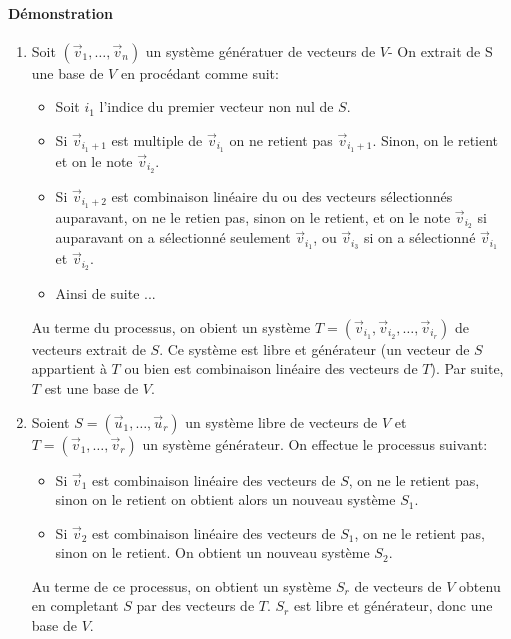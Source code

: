 \paragraph{Démonstration}
\begin{enumerate}
  \item Soit $(\vec{v}_1, \ldots, \vec{v}_n)$ un système génératuer de vecteurs de $V$- On extrait de S une base de $V$ en procédant comme suit:
    \begin{itemize}
      \item Soit $i_1$ l'indice du premier vecteur non nul de $S$.
      \item Si $\vec{v}_{i_1 + 1}$ est multiple de $\vec{v}_{i_1}$ on ne retient pas $\vec{v}_{i_1 + 1}$. Sinon, on le retient et on le note $\vec{v}_{i_2}$.
      \item Si $\vec{v}_{i_1 + 2}$ est combinaison linéaire du ou des vecteurs sélectionnés auparavant, on ne le retien pas, sinon on le retient, et on le note $\vec{v}_{i_2}$ si auparavant on a sélectionné seulement $\vec{v}_{i_1}$, ou $\vec{v}_{i_3}$ si on a sélectionné $\vec{v}_{i_1}$ et $\vec{v}_{i_2}$.
      \item Ainsi de suite ...
    \end{itemize}
    Au terme du processus, on obient un système $T = (\vec{v}_{i_1}, \vec{v}_{i_2}, \ldots, \vec{v}_{i_r})$ de vecteurs extrait de $S$. Ce système est libre et générateur (un vecteur de $S$ appartient à $T$ ou bien est combinaison linéaire des vecteurs de $T$). Par suite, $T$ est une base de $V$.
  
  \item Soient $S=(\vec{u}_1, \ldots, \vec{u}_r)$ un système libre de vecteurs de $V$ et $T=(\vec{v}_1, \ldots, \vec{v}_r)$ un système générateur. On effectue le processus suivant:
    \begin{itemize}
      \item Si $\vec{v}_1$ est combinaison linéaire des  vecteurs de $S$, on ne le retient pas, sinon on le retient on obtient alors un nouveau système $S_1$.
      \item Si $\vec{v}_2$ est combinaison linéaire des vecteurs de $S_1$, on ne le retient pas, sinon on le retient. On obtient un nouveau système $S_2$.
    \end{itemize}
    Au terme de ce processus, on obtient un système $S_r$ de vecteurs de $V$ obtenu en completant $S$ par des vecteurs de $T$. $S_r$ est libre et générateur, donc une base de $V$.
    

\end{enumerate}
